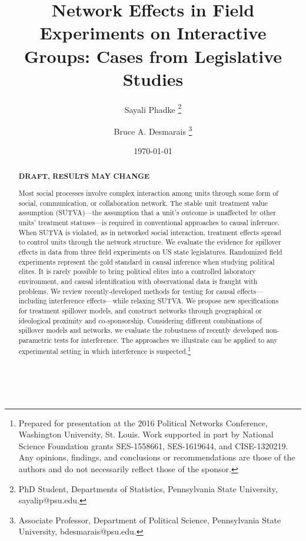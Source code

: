 \documentclass[12pt]{article}
\title{\vspace{-2cm} Network Effects in Field Experiments on Interactive Groups: Cases from Legislative Studies }
\author{Sayali Phadke \thanks{\footnotesize{PhD Student, Departments of Statistics, Pennsylvania State University, sayalip@psu.edu.}} \and Bruce A. Desmarais \thanks{\footnotesize{Associate Professor, Department of Political Science, Pennsylvania State University, bdesmarais@psu.edu.}}} \date{\today}
\begin{document}
\maketitle




\begin{abstract} 
\vspace{.3cm}
\begin{center}
{\bf DRAFT, RESULTS MAY CHANGE}
\end{center}
\vspace{.3cm}

\noindent  Most social processes involve complex interaction among units through some form of social, communication, or collaboration network. The stable unit treatment value assumption (SUTVA)---the assumption that a unit's outcome is unaffected by other units' treatment statuses---is required in conventional approaches to causal inference. When SUTVA is violated, as in networked social interaction, treatment effects spread to control units through the network structure. We evaluate the evidence for spillover effects in data from three field experiments on US state legislatures. Randomized field experiments represent the gold standard in causal inference when studying political elites. It is rarely possible to bring political elites into a controlled laboratory environment, and causal identification with observational data is fraught with problems. We review recently-developed methods for testing for causal effects---including interference effects---while relaxing SUTVA. We propose new specifications for treatment spillover models, and construct networks through geographical or ideological proximity and co-sponsorship. Considering different combinations of spillover models and networks, we evaluate the robustness of recently developed non-parametric tests for interference. The approaches we illustrate can be applied to any experimental setting in which interference is suspected.\footnote{Prepared for presentation at the 2016 Political Networks Conference, Washington University, St. Louis. Work supported in part by National Science Foundation grants SES-1558661, SES-1619644, and CISE-1320219. Any opinions, findings, and conclusions or recommendations are those of the authors and do not necessarily reflect those of the sponsor.} 
\\~\\~\\
\end{abstract}
\end{document}
